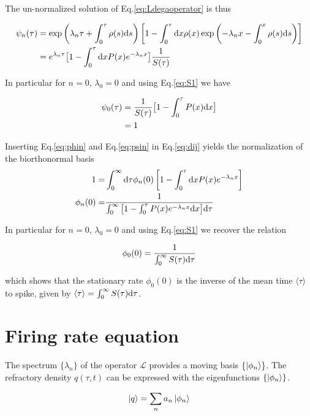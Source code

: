 \documentclass[12pt,twoside]{report}
\def \dd  {{\rm d}}
\begin{document}
The un-normalized solution of Eq.\eqref{eq:Ldegaoperator} is thus

\begin{align}
\label{eq:psin}
\psi_n(\tau)&=\exp\left(\lambda_n\tau+\int_0^\tau\rho(s)\dd s\right)\left[1-\int^\tau_0\dd x \rho(x) \exp\left(-\lambda_nx-\int_0^x\rho(s)\dd s\right)\right]\nonumber\\
&=e^{\lambda_n\tau}\big[1-\int^\tau_0 \dd x P(x) e^{-\lambda_nx}\big]\frac{1}{S(\tau)}
\end{align}

In particular for $n=0$, $\lambda_0=0$ and using Eq.\eqref{eq:S1}  we have 

\begin{align}
\label{eq:psi0}
\psi_0(\tau)&=\frac{1}{S(\tau)}\big[1-\int^\tau_0P(x) \dd x \big] \nonumber \\
&=1
\end{align}

 Inserting Eq.\eqref{eq:phin} and Eq.\eqref{eq:psin} in Eq.\eqref{eq:dij} yields the normalization of the biorthonormal basis 
\begin{align}
\label{eq:normalization}
1=&\int_0^{\infty}\dd \tau\phi_n(0)\left[1-\int^\tau_0 \dd x P(x) e^{-\lambda_nx}\right] \\
\phi_n(0) =&\frac{1}{\int_0^{\infty}\big[1-\int^\tau_0 P(x) e^{-\lambda_nx}\dd x\big]\dd\tau}
\end{align}


In particular for $n=0$, $\lambda_0=0$ and using Eq.\eqref{eq:S1} we recover the relation

\begin{equation}
\phi_0(0) = \frac{1}{\int_0^{\infty}S(\tau)\dd\tau}
\end{equation}

which shows that the stationary rate $\phi_0(0)$ is the inverse of the mean time $\langle\tau\rangle$ to spike, given by $\langle\tau\rangle=\int_0^{\infty}S(\tau)\dd\tau$.

\section{Firing rate equation}
\label{sec:emissionrateequation}

The spectrum $\{\lambda_n\}$ of the operator $\mathcal{L}$ provides a moving basis $ \{\ket{\phi_n}\}$. The refractory density $q(\tau,t)$ can be expressed with the eigenfunctions  $ \{\ket{\phi_n}\}$. 

\begin{equation}
\label{eq:q}
\ket{q}=\sum_na_n\ket{\phi_n}
\end{equation}
\end{document}
